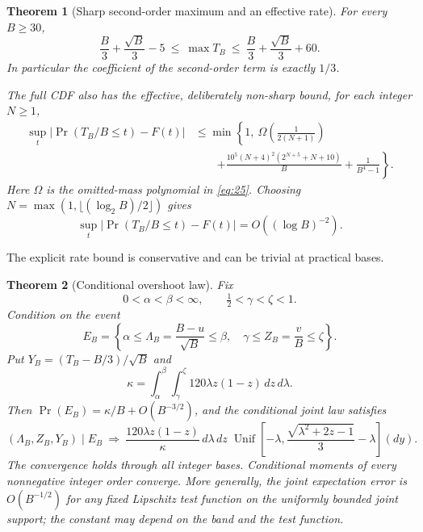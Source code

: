 \documentclass[11pt]{amsart}
\newtheorem{theorem}{Theorem}
\begin{document}
\begin{theorem}[Sharp second-order maximum and an effective rate]\label{thm:4}
For every \(B\ge30\), \begin{equation}\label{eq:9}
\frac B3+\frac{\sqrt B}{3}-5
 \ \le\ \max T_B\ \le\
 \frac B3+\frac{\sqrt B}{3}+60.
\end{equation} In particular the coefficient of the second-order term is exactly \(1/3\).

The full CDF also has the effective, deliberately non-sharp bound, for each integer \(N\ge1\), \begin{equation}\label{eq:10}
\begin{aligned}
 \sup_t\left|\Pr(T_B/B\le t)-F(t)\right|
 &\le \min\left\{1,\ \Omega\!\left(\frac1{2(N+1)}\right)\right.\\
 &\qquad\left. +\frac{10^5(N+4)^2(2^{N+5}+N+10)}{B}
 +\frac1{B^4-1}\right\}.
 \end{aligned}
\end{equation} Here \(\Omega\) is the omitted-mass polynomial in \eqref{eq:25}. Choosing \(N=\max(1,\lfloor(\log_2 B)/2\rfloor)\) gives \begin{equation}\label{eq:11}
\sup_t\left|\Pr(T_B/B\le t)-F(t)\right|
       =O((\log B)^{-2}).
\end{equation}
\end{theorem}

The explicit rate bound is conservative and can be trivial at practical bases.

\begin{theorem}[Conditional overshoot law]\label{thm:5}
Fix \[0<\alpha<\beta<\infty,\qquad \tfrac12<\gamma<\zeta<1.\] Condition on the event \[E_B=\left\{\alpha\le\Lambda_B=\frac{B-u}{\sqrt B}\le \beta,
                 \quad \gamma\le Z_B=\frac vB\le \zeta\right\}.\] Put \(Y_B=(T_B-B/3)/\sqrt B\) and \[\kappa=\int_\alpha^\beta\int_\gamma^\zeta120\lambda z(1-z)\,dz\,d\lambda.\] Then \(\Pr(E_B)=\kappa/B+O(B^{-3/2})\), and the conditional joint law satisfies \begin{equation}\label{eq:12}
(\Lambda_B,Z_B,Y_B)\mid E_B\ \Rightarrow\
 \frac{120\lambda z(1-z)}{\kappa}\,d\lambda\,dz\;
 \operatorname{Unif}\left[
 -\lambda,\frac{\sqrt{\lambda^2+2z-1}}3-\lambda
 \right](dy).
\end{equation} The convergence holds through all integer bases. Conditional moments of every nonnegative integer order converge. More generally, the joint expectation error is \(O(B^{-1/2})\) for any fixed Lipschitz test function on the uniformly bounded joint support; the constant may depend on the band and the test function.
\end{theorem}
\end{document}
